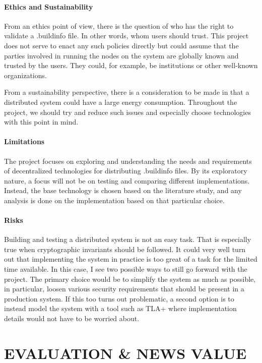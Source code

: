 \documentclass{article}
\begin{document}
\paragraph{Ethics and Sustainability} From an ethics point of view, there is the question of who has the right to validate a .buildinfo file. In other words, whom users should trust. This project does not serve to enact any such policies directly but could assume that the parties involved in running the nodes on the system are globally known and trusted by the users. They could, for example, be institutions or other well-known organizations. 

From a sustainability perspective, there is a consideration to be made in that a distributed system could have a large energy consumption. Throughout the project, we should try and reduce such issues and especially choose technologies with this point in mind. 

\paragraph{Limitations}

The project focuses on exploring and understanding the needs and requirements of decentralized technologies for distributing .buildinfo files. By its exploratory nature, a focus will not be on testing and comparing different implementations. Instead, the base technology is chosen based on the literature study, and any analysis is done on the implementation based on that particular choice.

\paragraph{Risks}
Building and testing a distributed system is not an easy task. That is especially true when cryptographic invariants should be followed. It could very well turn out that implementing the system in practice is too great of a task for the limited time available. In this case, I see two possible ways to still go forward with the project. The primary choice would be to simplify the system as much as possible, in particular, loosen various security requirements that should be present in a production system. If this too turns out problematic, a second option is to instead model the system with a tool such as TLA+ \cite{lamport_specifying_nodate} where implementation details would not have to be worried about. 

\section*{EVALUATION \& NEWS VALUE}
\end{document}
